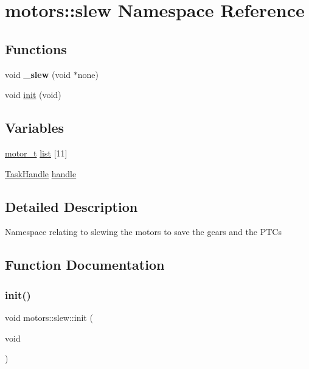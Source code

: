 \hypertarget{namespacemotors_1_1slew}{}\section{motors\+:\+:slew Namespace Reference}
\label{namespacemotors_1_1slew}
\subsection*{Functions}
\begin{DoxyCompactItemize}
\item 
\mbox{\label{namespacemotors_1_1slew_a02ed14d669e810c120b00bf1fde14d47}} 
void {\bfseries \+\_\+slew} (void $\ast$none)
\item 
void \hyperlink{namespacemotors_1_1slew_a751ca9ca53ca9e417c79a9f879ea10c5}{init} (void)
\end{DoxyCompactItemize}
\subsection*{Variables}
\begin{DoxyCompactItemize}
\item 
\hyperlink{structmotor__t}{motor\+\_\+t} \hyperlink{namespacemotors_1_1slew_a80ca3dc0e033fa8ad84aa8ce77765e3b}{list} \mbox{[}11\mbox{]}
\item 
\hyperlink{API_8h_a23dca3c0de10682afb982677ff292f77}{Task\+Handle} \hyperlink{namespacemotors_1_1slew_ac3ee7020adfbe186103f5a8a027eb8fb}{handle}
\end{DoxyCompactItemize}


\subsection{Detailed Description}
Namespace relating to slewing the motors to save the gears and the P\+T\+Cs 

\subsection{Function Documentation}
\mbox{\label{namespacemotors_1_1slew_a751ca9ca53ca9e417c79a9f879ea10c5}} 
\subsubsection{\texorpdfstring{init()}{init()}}
{\footnotesize\ttfamily void motors\+::slew\+::init (\begin{DoxyParamCaption}\item[{void}]{ }\end{DoxyParamCaption})}

